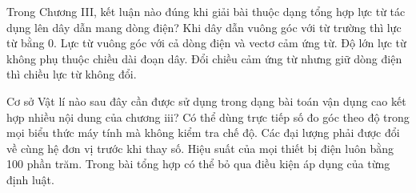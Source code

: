 \begin{ex}
Trong Chương III, kết luận nào đúng khi giải bài thuộc dạng tổng hợp lực từ tác dụng lên dây dẫn mang dòng điện?
\choice
{Khi dây dẫn vuông góc với từ trường thì lực từ bằng 0.}
{\True Lực từ vuông góc với cả dòng điện và vectơ cảm ứng từ.}
{Độ lớn lực từ không phụ thuộc chiều dài đoạn dây.}
{Đổi chiều cảm ứng từ nhưng giữ dòng điện thì chiều lực từ không đổi.}
\end{ex}

\begin{ex}
Cơ sở Vật lí nào sau đây cần được sử dụng trong dạng bài toán vận dụng cao kết hợp nhiều nội dung của chương iii?
\choice
{Có thể dùng trực tiếp số đo góc theo độ trong mọi biểu thức máy tính mà không kiểm tra chế độ.}
{\True Các đại lượng phải được đổi về cùng hệ đơn vị trước khi thay số.}
{Hiệu suất của mọi thiết bị điện luôn bằng 100 phần trăm.}
{Trong bài tổng hợp có thể bỏ qua điều kiện áp dụng của từng định luật.}
\end{ex}

